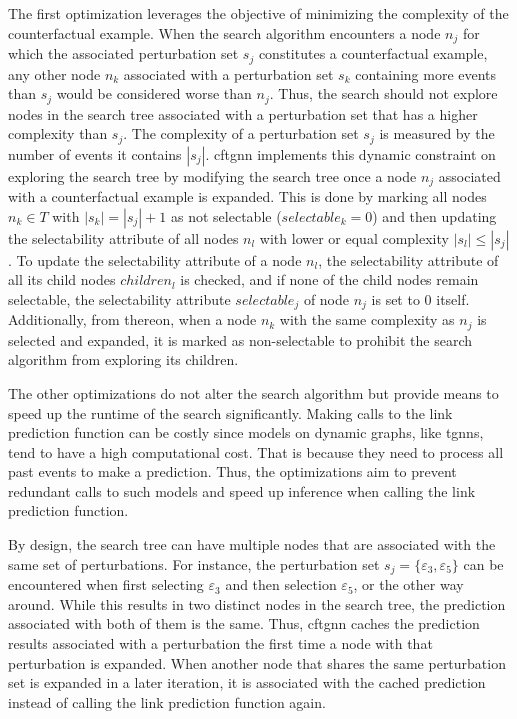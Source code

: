 The first optimization leverages the objective of minimizing the complexity of the counterfactual example. When the search algorithm encounters a node $n_j$ for which the associated perturbation set $s_j$ constitutes a counterfactual example, any other node $n_k$ associated with a perturbation set $s_k$ containing more events than $s_j$ would be considered worse than $n_j$. Thus, the search should not explore nodes in the search tree associated with a perturbation set that has a higher complexity than $s_j$. The complexity of a perturbation set $s_j$ is measured by the number of events it contains $|s_j|$. \gls{cftgnn} implements this dynamic constraint on exploring the search tree by modifying the search tree once a node $n_j$ associated with a counterfactual example is expanded. This is done by marking all nodes $n_k \in T$ with $|s_k| = |s_j| + 1$ as not selectable ($selectable_k = 0$) and then updating the selectability attribute of all nodes $n_l$ with lower or equal complexity $|s_l| \leq |s_j|$. To update the selectability attribute of a node $n_l$, the selectability attribute of all its child nodes $children_l$ is checked, and if none of the child nodes remain selectable, the selectability attribute $selectable_j$ of node $n_j$ is set to $0$ itself.
Additionally, from thereon, when a node $n_k$ with the same complexity as $n_j$ is selected and expanded, it is marked as non-selectable to prohibit the search algorithm from exploring its children.

The other optimizations do not alter the search algorithm but provide means to speed up the runtime of the search significantly. Making calls to the link prediction function can be costly since models on dynamic graphs, like \glspl{tgnn}, tend to have a high computational cost. That is because they need to process all past events to make a prediction. Thus, the optimizations aim to prevent redundant calls to such models and speed up inference when calling the link prediction function.

By design, the search tree can have multiple nodes that are associated with the same set of perturbations. For instance, the perturbation set $s_j = \{\varepsilon_3, \varepsilon_5\}$ can be encountered when first selecting $\varepsilon_3$ and then selection $\varepsilon_5$, or the other way around. While this results in two distinct nodes in the search tree, the prediction associated with both of them is the same. Thus, \gls{cftgnn} caches the prediction results associated with a perturbation the first time a node with that perturbation is expanded. When another node that shares the same perturbation set is expanded in a later iteration, it is associated with the cached prediction instead of calling the link prediction function again.

